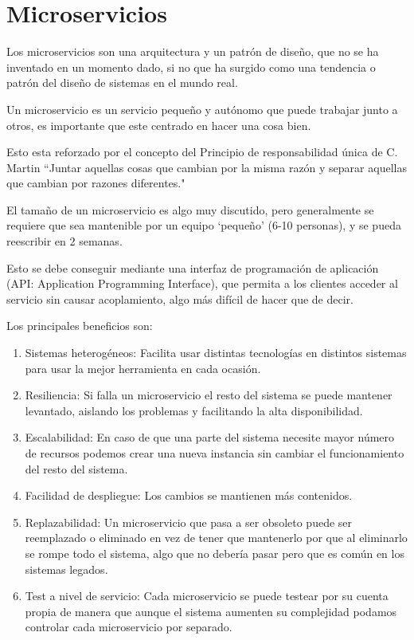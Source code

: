 \section{Microservicios}

Los microservicios son una arquitectura y un patrón de diseño, que no se ha inventado en un momento dado, si no que ha surgido como una tendencia o patrón del diseño de sistemas en el mundo real. 

Un microservicio es un servicio pequeño y autónomo que puede trabajar junto a otros, es importante que este centrado en hacer una cosa bien.

Esto esta reforzado por el concepto del Principio de responsabilidad única de C. Martin\cite{martin03} ``Juntar aquellas cosas que cambian por la misma razón y separar aquellas que cambian por razones diferentes."

El tamaño de un microservicio es algo muy discutido, pero generalmente se requiere que sea mantenible por un equipo `pequeño' (6-10 personas), y se pueda reescribir en 2 semanas.

Esto se debe conseguir mediante una interfaz de programación de aplicación (API: Application Programming Interface), que permita a los clientes acceder al servicio sin causar acoplamiento, algo más difícil de hacer que de decir.

Los principales beneficios son:
\begin{enumerate}
\item Sistemas heterogéneos: Facilita usar distintas tecnologías en distintos sistemas para usar la mejor herramienta en cada ocasión.
\item Resiliencia: Si falla un microservicio el resto del sistema se puede mantener levantado, aislando los problemas y facilitando la alta disponibilidad.
\item Escalabilidad: En caso de que una parte del sistema necesite mayor número de recursos podemos crear una nueva instancia sin cambiar el funcionamiento del resto del sistema.
\item Facilidad de despliegue: Los cambios se mantienen más contenidos.
\item Replazabilidad: Un microservicio que pasa a ser obsoleto puede ser reemplazado o eliminado en vez de tener que mantenerlo por que al eliminarlo se rompe todo el sistema, algo que no debería pasar pero que es común en los sistemas legados.
\item Test a nivel de servicio: Cada microservicio se puede testear por su cuenta propia de manera que aunque el sistema aumenten su complejidad podamos controlar cada microservicio por separado.
\end{enumerate}

